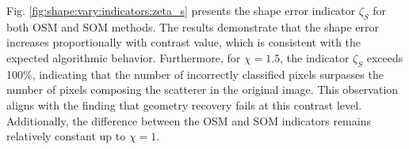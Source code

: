 \documentclass{IEEEtran}
\begin{document}

                Fig. \ref{fig:shape:vary:indicators:zeta_s} presents the shape error indicator $\zeta_S$ for both OSM and SOM methods. The results demonstrate that the shape error increases proportionally with contrast value, which is consistent with the expected algorithmic behavior. Furthermore, for $\chi = 1.5$, the indicator $\zeta_S$ exceeds 100\%, indicating that the number of incorrectly classified pixels surpasses the number of pixels composing the scatterer in the original image. This observation aligns with the finding that geometry recovery fails at this contrast level. Additionally, the difference between the OSM and SOM indicators remains relatively constant up to $\chi = 1$.
\end{document}

